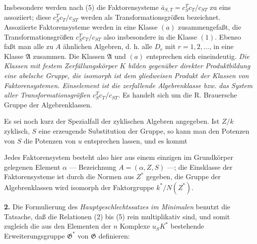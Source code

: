 
Insbesondere werden nach (5) die Faktorensysteme \(\bar a_{S,T}=c_S^Tc_T/c_{ST}\) zu eins assoziiert; diese \(c_S^Tc_T/c_{ST}\) werden als Transformationsgrößen bezeichnet. Assoziierte Faktorensysteme werden in eine Klasse \((a)\) zusammengefaßt, die Transformationsgrößen \(c_S^Tc_T/c_{ST}\) also insbesondere in die Klasse \((1)\). Ebenso faßt man alle zu \(A\) ähnlichen Algebren, d. h. alle \(D_r\) mit \(r=1,2,\ldots\), in eine Klasse \(\mathfrak A\) zusammen. Die Klassen \(\mathfrak A\) und \((a)\) entsprechen sich eineindeutig. \emph{Die Klassen mit festem Zerfällungskörper \(K\) bilden gegenüber direkter Produktbildung eine abelsche Gruppe, die isomorph ist dem gliedweisen Produkt der Klassen von Faktorensystemen. Einselement ist die zerfallende Algebrenklasse bzw. das System aller Transformationsgrößen \(c_S^Tc_T/c_{ST}\).} Es handelt sich um die R. Brauersche Gruppe der Algebrenklassen.

Es sei noch kurz der Spezialfall der zyklischen Algebren angegeben. Ist \(Z/k\) zyklisch, \(S\) eine erzeugende Substitution der Gruppe, so kann man den Potenzen von \(S\) die Potenzen von \(u\) entsprechen lassen, und es kommt


Jedes Faktorensystem besteht also hier aus einem einzigen im Grundkörper gelegenen Element \(\alpha\) --- Bezeichnung \(A=(\alpha,Z,S)\) ---; die Einsklasse der Faktorensysteme ist durch die Normen aus \(Z^*\) gegeben, die Gruppe der Algebrenklassen wird isomorph der Faktorgruppe \(k^*/N(Z^*)\).

\noindent\textbf{2.} Die Formulierung des \emph{Hauptgeschlechtssatzes im Minimalen} benutzt die Tatsache, daß die Relationen (2) bis (5) rein multiplikativ sind, und somit zugleich die aus den Elementen der \(n\) Komplexe \(u_SK^*\) bestehende Erweiterungsgruppe \(\mathfrak G^*\) von \(\mathfrak G\) definieren:


